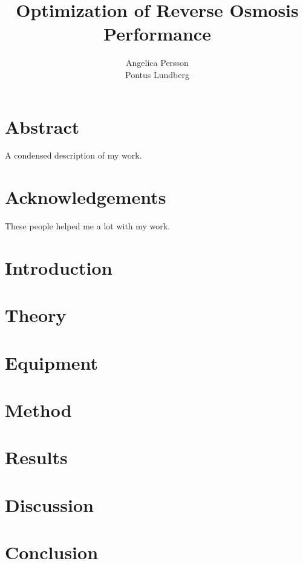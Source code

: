 \documentclass{LTHthesis}
\begin{document}
\begin{titlepages}
\author{Angelica Persson \\ Pontus Lundberg}
\title{Optimization of Reverse Osmosis Performance}
\end{titlepages}
\chapter*{Abstract}
A condensed description of my work.
\chapter*{Acknowledgements}
These people helped me a lot with my work.
\tableofcontents

\chapter{Introduction}


%

\chapter{Theory}


\chapter{Equipment}


\chapter{Method}


\chapter{Results}


\chapter{Discussion}


\chapter{Conclusion}


\printbibliography  %
\end{document}

